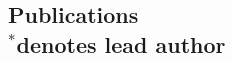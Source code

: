 \documentclass[margin,line]{res}
\let\resumesection\section
\begin{document}
\begin{resume}
  \vspace{20pt}
  \section{\sc Publications \\ {\footnotesize$^*$denotes lead author}}

  \renewcommand{\section}[2]{}
  \renewcommand{\section}{\resumesection}





\end{resume}
\end{document}
